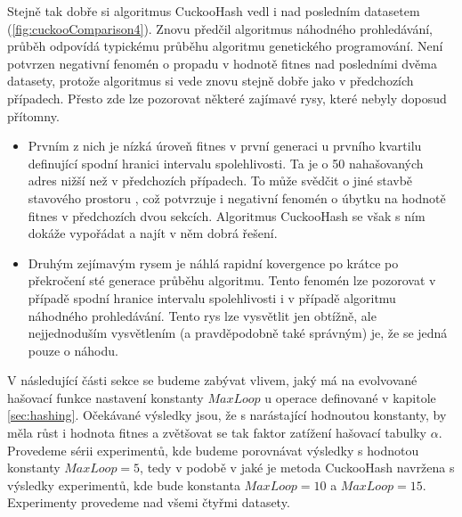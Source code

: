 Stejně tak dobře si algoritmus CuckooHash vedl i nad posledním datasetem (\ref{fig:cuckooComparison4}). Znovu předčil algoritmus náhodného prohledávání,
průběh odpovídá typickému průběhu algoritmu genetického programování. Není potvrzen negativní fenomén o propadu v hodnotě
fitnes nad posledními dvěma datasety, protože algoritmus si vede znovu stejně dobře jako v předchozích případech. Přesto zde lze
pozorovat některé zajímavé rysy, které nebyly doposud přítomny.
\begin{itemize}
	\item Prvním z nich je nízká úroveň fitnes v první generaci u prvního kvartilu definující spodní hranici intervalu spolehlivosti. Ta je o 50 nahašovaných
		 adres nižší než v předchozích případech. To může svědčit o jiné stavbě stavového prostoru
		, což potvrzuje i negativní fenomén o úbytku na hodnotě fitnes v předchozích dvou sekcích. Algoritmus CuckooHash se však s ním dokáže vypořádat a najít
		v něm dobrá řešení.
	\item Druhým zejímavým rysem je náhlá rapidní kovergence po krátce po překročení sté generace průběhu algoritmu. Tento fenomén lze pozorovat v případě
		spodní hranice intervalu spolehlivosti i v případě algoritmu náhodného prohledávání. Tento rys lze vysvětlit jen obtížně, ale nejjednoduším vysvětlením (a
		pravděpodobně také správným) je, že se jedná pouze o náhodu.
\end{itemize}

V následující části sekce se budeme zabývat vlivem, jaký má na evolvované hašovací funkce nastavení konstanty $MaxLoop$ u operace  definované
v kapitole \ref{sec:hashing}. Očekávané výsledky jsou, že s narástající hodnoutou konstanty, by měla růst i hodnota fitnes a zvětšovat se tak faktor zatížení
hašovací tabulky $\alpha$. Provedeme sérii experimentů, kde budeme porovnávat výsledky s hodnotou konstanty $MaxLoop = 5$, tedy v podobě v jaké je metoda
CuckooHash navržena s výsledky experimentů, kde bude konstanta $MaxLoop = 10$ a $MaxLoop = 15$. Experimenty provedeme nad všemi čtyřmi datasety.

